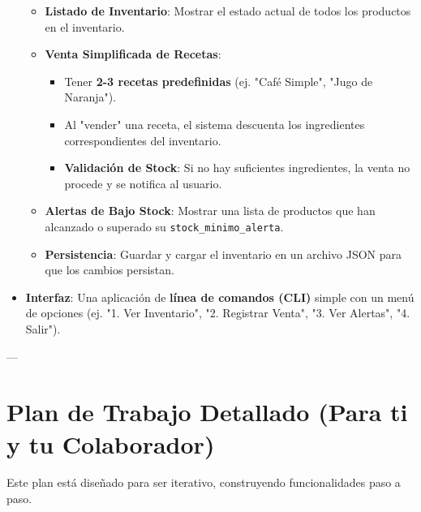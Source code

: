\documentclass{article}
\begin{document}
\begin{itemize}[label=$\bullet$]
	\begin{itemize}[label=$\bullet$]
			\item \textbf{Listado de Inventario}: Mostrar el estado actual de todos los productos en el inventario.
			\item \textbf{Venta Simplificada de Recetas}:
			\begin{itemize}
				\item Tener \textbf{2-3 recetas predefinidas} (ej. "Café Simple", "Jugo de Naranja").
				\item Al "vender" una receta, el sistema descuenta los ingredientes correspondientes del inventario.
				\item \textbf{Validación de Stock}: Si no hay suficientes ingredientes, la venta no procede y se notifica al usuario.
			\end{itemize}
			\item \textbf{Alertas de Bajo Stock}: Mostrar una lista de productos que han alcanzado o superado su \texttt{stock\_minimo\_alerta}.
			\item \textbf{Persistencia}: Guardar y cargar el inventario en un archivo JSON para que los cambios persistan.
		\end{itemize}
		\item \textbf{Interfaz}: Una aplicación de \textbf{línea de comandos (CLI)} simple con un menú de opciones (ej. "1. Ver Inventario", "2. Registrar Venta", "3. Ver Alertas", "4. Salir").
	\end{itemize}
	
	---
	
	\section{Plan de Trabajo Detallado (Para ti y tu Colaborador)}
	Este plan está diseñado para ser iterativo, construyendo funcionalidades paso a paso.
	
\end{document}
